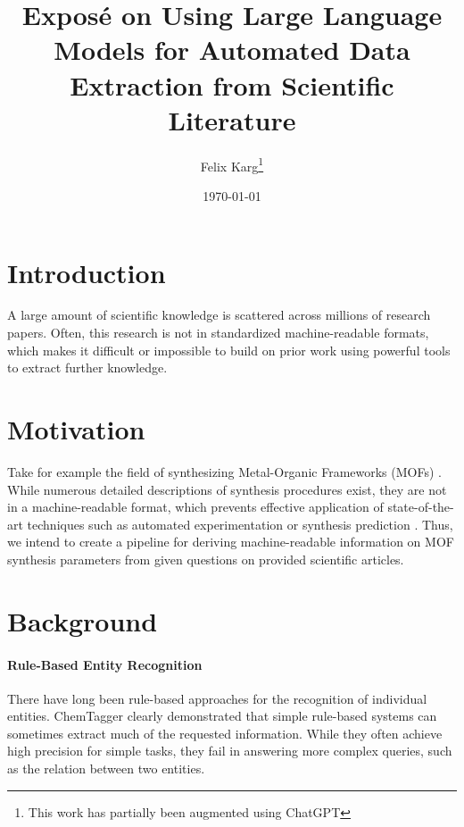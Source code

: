 \documentclass[a4paper,12pt]{article}
\title{Exposé on Using Large Language Models for Automated Data Extraction from Scientific Literature}
\author{Felix Karg\footnote{This work has partially been augmented using ChatGPT}}
\date{\today}
\newcommand{\margtodo}                                 %
{\marginpar{\textbf{\textcolor{red}{ToDo}}}{}}
\newcommand{\todo}[1]
{{\textbf{\textcolor{red}{[\margtodo{}#1]}}}{}}   %
\begin{document}
\maketitle




\section{Introduction}
A large amount of scientific knowledge is scattered across millions of research
papers. Often, this research is not in standardized machine-readable formats,
which makes it difficult or impossible to build on prior work using powerful
tools to extract further knowledge.  %

\section{Motivation}
Take for example the field of synthesizing Metal-Organic Frameworks (MOFs)
\cite{zhou_introduction_2012}. While numerous detailed descriptions of
synthesis procedures exist, they are not in a machine-readable format, which
prevents effective application of state-of-the-art techniques such as automated
experimentation \cite{shi_automated_2021} or synthesis prediction
\cite{luo_mof_2022}. Thus, we intend to create a pipeline for deriving
machine-readable information on MOF synthesis parameters from given questions
on provided scientific articles.


\section{Background}
\paragraph{Rule-Based Entity Recognition}
There have long been rule-based approaches for the recognition of individual
entities. ChemTagger \cite{hawizy_chemicaltagger_2011} clearly demonstrated
that simple rule-based systems can sometimes extract much of the requested
information. While they often achieve high precision for simple tasks,
they fail in answering more complex queries, such as the relation between
two entities.
\end{document}
